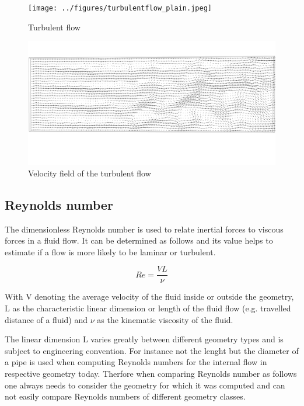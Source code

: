 \begin{figure}[htp]
\centering
\texttt{[image: ../figures/turbulentflow\_plain.jpeg]}
\caption{Turbulent flow}
\label{fig:TurbulentFlowPlain}
\end{figure}



\begin{figure}[htp]
\centering
\includegraphics[scale=0.05]{../figures/turbulentflow_vectors.png}
\caption{Velocity field of the turbulent flow}
\label{fig:TurbulentFlowVector}
\end{figure}

\subsection{Reynolds number}

The dimensionless Reynolds number is used to relate inertial forces to viscous forces in a fluid flow. It can be determined as follows and its value helps to estimate if a flow is more likely to be laminar or turbulent. 


\[
Re = 
\frac {VL}{\nu} 
\]


With V denoting the average velocity of the fluid inside or outside the geometry, L
as the characteristic linear dimension or length of the fluid flow (e.g. travelled distance of a fluid) and \(\nu\) as the kinematic viscosity of the fluid.

The linear dimension L varies greatly between different geometry types and is subject to engineering convention. For instance not the lenght but the diameter of a pipe is used when computing Reynolds numbers for the internal flow in respective geometry today. Therfore when comparing Reynolds number as follows one always needs to consider the geometry for which it was computed and can not easily compare Reynolds numbers of different geometry classes.

